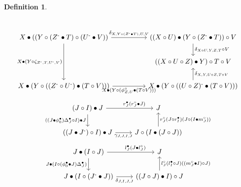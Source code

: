 \documentclass[nosumlimits,twoside]{amsart}
\theoremstyle{definition}
\newtheorem{definition}[definition]{\sc Definition}
\theoremstyle{remark}
\def\revsn{\text{-}}
\begin{document}
\begin{definition}
\begin{equation}
\begin{tikzcd}
\end{tikzcd}
\end{equation}
\vspace{-.2cm}
\begin{equation}
\label{form:phivarphi2NEW}
    \begin{tikzcd}
	{X\bullet((Y\circ(Z^{\revsn}\bullet T)\circ(U^{\revsn}\bullet V))} && {((X\circ U)\bullet(Y\circ(Z^{\revsn}\bullet T))\circ V} \\
	&& {((X\circ U\circ Z)\bullet Y)\circ T\circ V} \\
	{X\bullet(Y\circ((Z^{\revsn}\circ  U^{\revsn})\bullet(T\circ V)))} && {X\bullet(Y\circ((U\circ Z)^{\revsn}\bullet(T\circ V)))}
	\arrow["{\delta_{X,Y\circ(Z^{\revsn}\bullet T),U,V}}", from=1-1, to=1-3]
	\arrow["{X\bullet(Y\circ\zeta_{Z^{\revsn}, T, U^{\revsn}, V})}"', from=1-1, to=3-1]
	\arrow["{\delta_{X\circ U,Y,Z,T}\circ V}", from=1-3, to=2-3]
	\arrow["{X\bullet(Y\circ(\phi^\circ_{Z,U}\bullet(T\circ V)))}"', from=3-1, to=3-3]
	\arrow["{\delta_{X,Y,U\circ Z,T\circ V}}"', from=3-3, to=2-3]
\end{tikzcd}
\end{equation}
\vspace{-.2cm}
\begin{equation}
\label{form:phi0gamma-bul}
  \begin{tikzcd}
	{(J\circ I)\bullet J} & J \\
	{((J\bullet J^\revsn)\circ I)\bullet J} & {J\circ (I\bullet (J\circ J))}
	\arrow["{r_J^\bullet (r^\circ_J\bullet J)}"{pos=0.6}, from=1-1, to=1-2]
	\arrow["{((J\bullet\phi^\bullet_0)\Delta_J^\bullet\circ I)\bullet J}"', from=1-1, to=2-1]
	\arrow["{\gamma_{J,J,I,J}}"', from=2-1, to=2-2]
	\arrow["{r^\circ_J(J\circ r^\bullet_I)(J\circ(I\bullet m^\circ_J))}"', from=2-2, to=1-2]
\end{tikzcd}
\end{equation}
\vspace{-.2cm}
\begin{equation}
\label{form:phi0delta-bul}
    \begin{tikzcd}
	{J\bullet (I\circ J)} & J \\
	{J\bullet(I\circ(J^\revsn\bullet J))} & {((J\circ J)\bullet I)\circ J}
	\arrow["{l_J^\bullet (J\bullet l^\circ_J)}"{pos=0.6}, from=1-1, to=1-2]
	\arrow["{J\bullet(I\circ(\phi_0^\bullet\bullet J)\Delta_J^\bullet)}"', from=1-1, to=2-1]
	\arrow["{\delta_{J,I,J,J}}"', from=2-1, to=2-2]
	\arrow["{l_J^\circ(l^\bullet_I\circ J)((m^\circ_J\bullet I)\circ J)}"', from=2-2, to=1-2]
\end{tikzcd}
\end{equation}
\end{definition}
\end{document}
